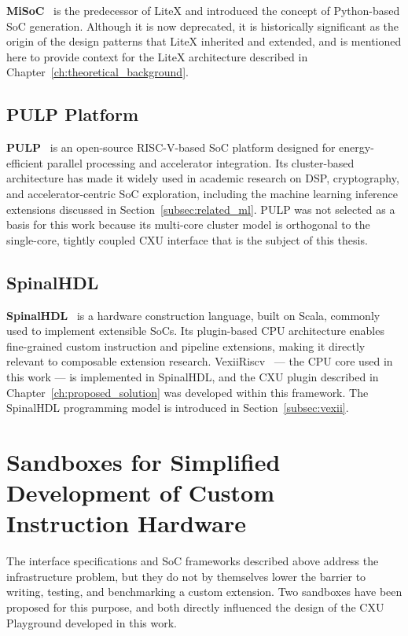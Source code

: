 \textbf{MiSoC}~\cite{MiSoC2014} is the predecessor of LiteX and introduced the concept
of Python-based SoC generation.
Although it is now deprecated, it is historically significant as the origin of the design
patterns that LiteX inherited and extended, and is mentioned here to provide context for
the LiteX architecture described in Chapter~\ref{ch:theoretical_background}.

\subsection{PULP Platform}
\label{subsec:pulp}

\textbf{PULP}~\cite{PULP2015} is an open-source RISC-V-based SoC platform designed for
energy-efficient parallel processing and accelerator integration.
Its cluster-based architecture has made it widely used in academic research on DSP,
cryptography, and accelerator-centric SoC exploration, including the machine learning
inference extensions discussed in Section~\ref{subsec:related_ml}.
PULP was not selected as a basis for this work because its multi-core cluster model is
orthogonal to the single-core, tightly coupled CXU interface that is the subject of
this thesis.

\subsection{SpinalHDL}
\label{subsec:spinalhdl}

\textbf{SpinalHDL}~\cite{SpinalHDL2018} is a hardware construction language, built on
Scala, commonly used to implement extensible SoCs.
Its plugin-based CPU architecture enables fine-grained custom instruction and pipeline
extensions, making it directly relevant to composable extension research.
VexiiRiscv~\cite{VexiiRiscVGithub} --- the CPU core used in this work --- is implemented
in SpinalHDL, and the CXU plugin described in Chapter~\ref{ch:proposed_solution} was
developed within this framework.
The SpinalHDL programming model is introduced in
Section~\ref{subsec:vexii}.

\section{Sandboxes for Simplified Development of Custom Instruction Hardware}
\label{sec:related_sandboxes}

The interface specifications and SoC frameworks described above address the infrastructure
problem, but they do not by themselves lower the barrier to writing, testing, and
benchmarking a custom extension.
Two sandboxes have been proposed for this purpose, and both directly influenced the
design of the CXU Playground developed in this work.

